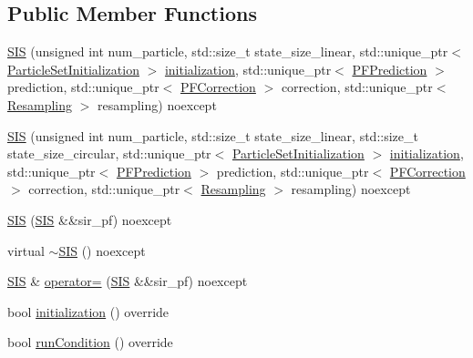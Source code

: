 \subsection*{Public Member Functions}
\begin{DoxyCompactItemize}
\item 
\mbox{\hyperlink{classbfl_1_1SIS_a44f7f06407314169a89d4b33d97978b1}{S\+IS}} (unsigned int num\+\_\+particle, std\+::size\+\_\+t state\+\_\+size\+\_\+linear, std\+::unique\+\_\+ptr$<$ \mbox{\hyperlink{classbfl_1_1ParticleSetInitialization}{Particle\+Set\+Initialization}} $>$ \mbox{\hyperlink{classbfl_1_1SIS_a59e4f35fc05d2088e6dc13d622cafd1d}{initialization}}, std\+::unique\+\_\+ptr$<$ \mbox{\hyperlink{classbfl_1_1PFPrediction}{P\+F\+Prediction}} $>$ prediction, std\+::unique\+\_\+ptr$<$ \mbox{\hyperlink{classbfl_1_1PFCorrection}{P\+F\+Correction}} $>$ correction, std\+::unique\+\_\+ptr$<$ \mbox{\hyperlink{classbfl_1_1Resampling}{Resampling}} $>$ resampling) noexcept
\item 
\mbox{\hyperlink{classbfl_1_1SIS_a630371dd09c45f979dbfee7da59d6ab2}{S\+IS}} (unsigned int num\+\_\+particle, std\+::size\+\_\+t state\+\_\+size\+\_\+linear, std\+::size\+\_\+t state\+\_\+size\+\_\+circular, std\+::unique\+\_\+ptr$<$ \mbox{\hyperlink{classbfl_1_1ParticleSetInitialization}{Particle\+Set\+Initialization}} $>$ \mbox{\hyperlink{classbfl_1_1SIS_a59e4f35fc05d2088e6dc13d622cafd1d}{initialization}}, std\+::unique\+\_\+ptr$<$ \mbox{\hyperlink{classbfl_1_1PFPrediction}{P\+F\+Prediction}} $>$ prediction, std\+::unique\+\_\+ptr$<$ \mbox{\hyperlink{classbfl_1_1PFCorrection}{P\+F\+Correction}} $>$ correction, std\+::unique\+\_\+ptr$<$ \mbox{\hyperlink{classbfl_1_1Resampling}{Resampling}} $>$ resampling) noexcept
\item 
\mbox{\hyperlink{classbfl_1_1SIS_af66e323d22b28f497152f2e3a65290ff}{S\+IS}} (\mbox{\hyperlink{classbfl_1_1SIS}{S\+IS}} \&\&sir\+\_\+pf) noexcept
\item 
virtual \mbox{\hyperlink{classbfl_1_1SIS_afe51d2eb915e0813ee4dc804a680566b}{$\sim$\+S\+IS}} () noexcept
\item 
\mbox{\hyperlink{classbfl_1_1SIS}{S\+IS}} \& \mbox{\hyperlink{classbfl_1_1SIS_a32458a24446df8126ace63f21de2bf02}{operator=}} (\mbox{\hyperlink{classbfl_1_1SIS}{S\+IS}} \&\&sir\+\_\+pf) noexcept
\item 
bool \mbox{\hyperlink{classbfl_1_1SIS_a59e4f35fc05d2088e6dc13d622cafd1d}{initialization}} () override
\item 
bool \mbox{\hyperlink{classbfl_1_1SIS_a669ac8eb19f6797f2735b94074727e8f}{run\+Condition}} () override

\end{DoxyCompactItemize}
